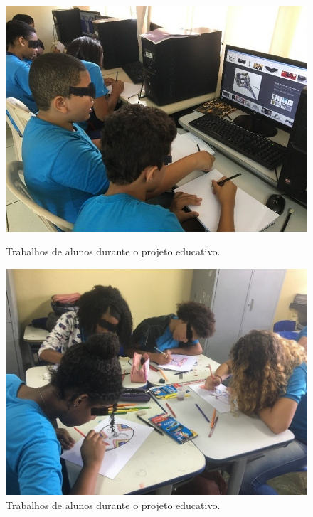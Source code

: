\documentclass[portuguese]{textolivre}
\begin{document}
\begin{figure}[h!]
 \centering
 \begin{minipage}{.9\textwidth}
 \begin{minipage}{.45\textwidth}
 \includegraphics[width=\textwidth]{Imagem7.jpg}
 \caption{Trabalhos de alunos durante o projeto educativo.}
 \label{fig7}
 \end{minipage}%
 \qquad
 \begin{minipage}{0.45\textwidth}
 \includegraphics[width=\textwidth]{Imagem8.jpg}
 \caption{Trabalhos de alunos durante o projeto educativo.}
 \label{fig8}
 \end{minipage}%
 \end{minipage}
\end{figure}
\end{document}
